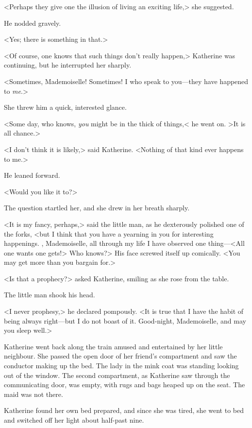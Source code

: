 <Perhaps they give one the illusion of living an exciting life,> she suggested.

He nodded gravely.

<Yes; there is something in that.>

<Of course, one knows that such things don't really happen,> Katherine was continuing, but he interrupted her sharply.

<Sometimes, Mademoiselle! Sometimes! I who speak to you—they have happened to \emph{me}.>

She threw him a quick, interested glance.

<Some day, who knows, \emph{you} might be in the thick of things,< he went on. >It is all chance.>

<I don't think it is likely,> said Katherine. <Nothing of that kind ever happens to me.>

He leaned forward.

<Would you like it to?>

The question startled her, and she drew in her breath sharply.

<It is my fancy, perhaps,> said the little man, as he dexterously polished one of the forks, <but I think that you have a yearning in you for interesting happenings. , Mademoiselle, all through my life I have observed one thing—<All one wants one gets!> Who knows?> His face screwed itself up comically. <You may get more than you bargain for.>

<Is that a prophecy?> asked Katherine, smiling as she rose from the table.

The little man shook his head.

<I never prophesy,> he declared pompously. <It is true that I have the habit of being always right—but I do not boast of it. Good-night, Mademoiselle, and may you sleep well.>

Katherine went back along the train amused and entertained by her little neighbour. She passed the open door of her friend's compartment and saw the conductor making up the bed. The lady in the mink coat was standing looking out of the window. The second compartment, as Katherine saw through the communicating door, was empty, with rugs and bags heaped up on the seat. The maid was not there.

Katherine found her own bed prepared, and since she was tired, she went to bed and switched off her light about half-past nine.

